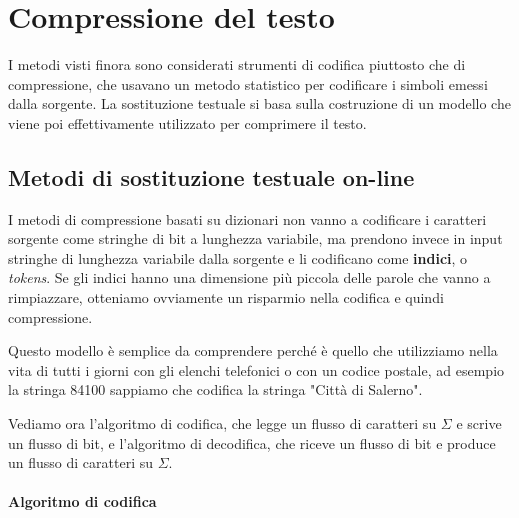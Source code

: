 \chapter{Compressione del testo}
I metodi visti finora sono considerati strumenti di codifica piuttosto che di compressione, che usavano un metodo statistico per codificare i simboli emessi dalla sorgente. La sostituzione testuale si basa sulla costruzione di un modello che viene poi effettivamente utilizzato per comprimere il testo.

\section{Metodi di sostituzione testuale on-line}

I metodi di compressione basati su dizionari non vanno a codificare i caratteri sorgente come stringhe di bit a lunghezza variabile, ma prendono invece in input stringhe di lunghezza variabile dalla sorgente e li codificano come \textbf{indici}, o \textit{tokens}. Se gli indici hanno una dimensione più piccola delle parole che vanno a rimpiazzare, otteniamo ovviamente un risparmio nella codifica e quindi compressione.

Questo modello è semplice da comprendere perché è quello che utilizziamo nella vita di tutti i giorni con gli elenchi telefonici o con un codice postale, ad esempio la stringa 84100 sappiamo che codifica la stringa "Città di Salerno".

Vediamo ora l'algoritmo di codifica, che legge un flusso di caratteri su \(\Sigma\) e scrive un flusso di bit, e l'algoritmo di decodifica, che riceve un flusso di bit e produce un flusso di caratteri su  \(\Sigma\). 

\subsubsection{Algoritmo di codifica}

